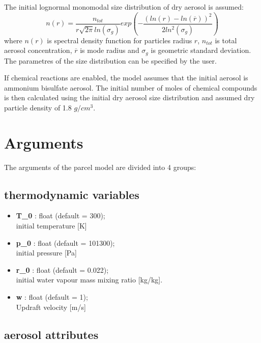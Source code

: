 \documentclass[11pt]{article}
\begin{document}
The initial lognormal monomodal size distribution of dry aerosol is assumed:
\begin{equation}
        n(r) = \frac{n_{tot}}{r\sqrt{2\pi}ln(\sigma_g)}exp(-\frac{(ln(r)-ln(\overline{r}))^2}{2ln^2(\sigma_g)})
        \label{lognormalny}
\end{equation}
\noindent
where $n(r)$ is spectral density function for particles radius $r$, $n_{tot}$ is total aerosol concentration, $\overline{r}$ is mode radius and $\sigma_g$ is geometric standard deviation.
The parametres of the size distribution can be specified by the user.

If chemical reactions are enabled, the model assumes that the initial aerosol is ammonium bisulfate aerosol.
The initial number of moles of chemical compounds is then calculated using the initial 
  dry aerosol size distribution and assumed dry particle density of 1.8 $g/cm^3$.


\section{Arguments}

The arguments of the parcel model are divided into 4 groups:

\subsection{thermodynamic variables}

\begin{itemize}

  \item \textbf{T\_0} : float (default = 300);\\ initial temperature [K]
  \item \textbf{p\_0} : float (default = 101300);\\ initial pressure [Pa]
  \item \textbf{r\_0} : float (default = 0.022);\\ initial water vapour mass mixing ratio [kg/kg].
  \item \textbf{w} : float (default = 1);\\ Updraft velocity [m/s]

\end{itemize}

\subsection{aerosol attributes}
\end{document}
